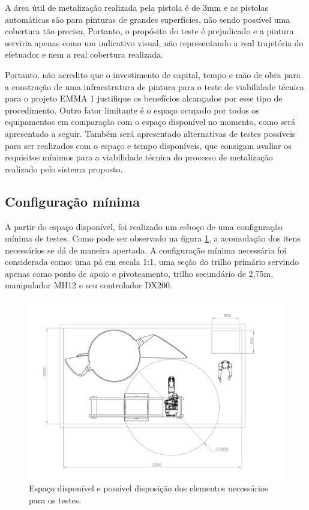 A área útil de metalização realizada pela pistola é de 3mm e as pistolas automáticas são para pinturas de grandes 
superfícies, não sendo possível uma cobertura tão precisa. Portanto, o propósito
do teste é prejudicado e a pintura serviria apenas como um indicativo visual,
não representando a real trajetória do efetuador e nem a real cobertura
realizada.

Portanto, não acredito que o investimento de capital, tempo e mão de obra para a construção de uma infraestrutura 
de pintura para o teste de viabilidade técnica para o projeto EMMA 1 justifique os benefícios alcançados por esse 
tipo de procedimento. Outro fator limitante é o espaço ocupado por todos os equipamentos em comparação com o 
espaço disponível no momento, como será apresentado a seguir. Também será apresentado alternativas de testes 
possíveis para ser realizados com o espaço e tempo disponíveis, que consigam avaliar os requisitos mínimos para 
a viabilidade técnica do processo de metalização realizado pelo sistema proposto.  

\subsection{Configuração mínima}

A partir do espaço disponível, foi realizado um esboço de uma configuração
mínima de testes. Como pode ser observado na figura \ref{fig::planta}, a
acomodação dos itens necessários se dá de maneira apertada. A
configuração mínima necessária foi considerada como: uma pá em escala 1:1, uma
seção do trilho primário servindo apenas como ponto de apoio e pivoteamento,
trilho secundário de 2,75m, manipulador MH12 e seu controlador DX200.

\begin{figure}[h!]
\centering
	\includegraphics[width=0.9\columnwidth]{figs/espaco/Montagem_Base_LEAD}
	\caption{Espaço disponível e possível disposição dos elementos necessários
	para os testes.}
	\label{fig::planta}
\end{figure}


